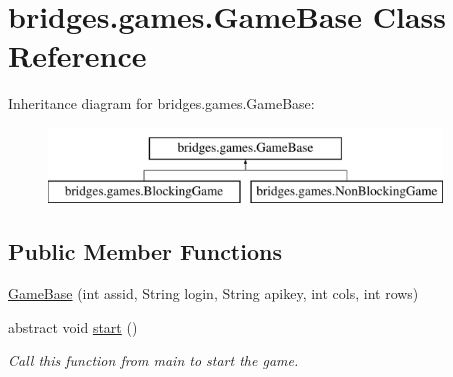 \hypertarget{classbridges_1_1games_1_1_game_base}{}\section{bridges.\+games.\+Game\+Base Class Reference}
\label{classbridges_1_1games_1_1_game_base}
Inheritance diagram for bridges.\+games.\+Game\+Base\+:\begin{figure}[H]
\begin{center}
\leavevmode
\includegraphics[height=2.000000cm]{classbridges_1_1games_1_1_game_base}
\end{center}
\end{figure}
\subsection*{Public Member Functions}
\begin{DoxyCompactItemize}
\item 
\hyperlink{classbridges_1_1games_1_1_game_base_a9ff11dcae7d4774a6341ff026212f96d}{Game\+Base} (int assid, String login, String apikey, int cols, int rows)
\item 
abstract void \hyperlink{classbridges_1_1games_1_1_game_base_a4b09bc799726e4a59b1ab039b941b188}{start} ()
\begin{DoxyCompactList}\small\item\em Call this function from main to start the game. \end{DoxyCompactList}\end{DoxyCompactItemize}
